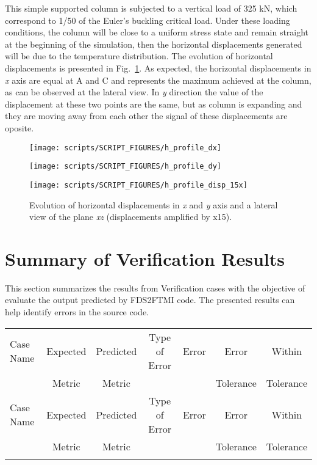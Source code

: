 \documentclass[11pt]{book}
\begin{document}
This simple supported column is subjected to a vertical load of 325 kN, which correspond to 1/50 of the Euler's buckling critical load. Under these loading conditions, the column will be close to a uniform stress state and remain straight at the beginning of the simulation, then the horizontal displacements generated will be due to the temperature distribution. The evolution of horizontal displacements is presented in Fig.~\ref{h_profile2}. As expected, the horizontal displacements in \textit{x} axis are equal at A and C and represents the maximum achieved at the column, as can be observed at the lateral view. In \textit{y} direction the value of the displacement at these two points are the same, but as column is expanding and they are moving away from each other the signal of these displacements are oposite.

\begin{figure}[ht]
\noindent
\parbox[c]{19em}{\texttt{[image: scripts/SCRIPT\_FIGURES/h\_profile\_dx]}} 
\parbox[c]{17.5em}{\texttt{[image: scripts/SCRIPT\_FIGURES/h\_profile\_dy]}}
\parbox[c]{1em}{\texttt{[image: scripts/SCRIPT\_FIGURES/h\_profile\_disp\_15x]}} 
\caption[The  results]{Evolution of horizontal displacements in \textit{x} and \textit{y} axis and a lateral view of the plane \textit{xz} (displacements amplified by x15).}
\label{h_profile2}
\end{figure}

\section{Summary of Verification Results}

This section summarizes the results from Verification cases with the objective of evaluate the output predicted by FDS2FTMI code. The presented results can help identify errors in the source code.

\begin{longtable}[c]{l c c c c c c }
\hline
Case Name & Expected & Predicted & Type of Error & Error & Error     & Within    \\
          & Metric   & Metric    &               &       & Tolerance & Tolerance \\ \hline \hline
\endfirsthead
\hline
Case Name & Expected & Predicted & Type of Error & Error & Error     & Within    \\
          & Metric   & Metric    &               &       & Tolerance & Tolerance \\ \hline \hline
\endhead
\hline
\endfoot
\hline
\endlastfoot

\end{longtable}


\end{document}
